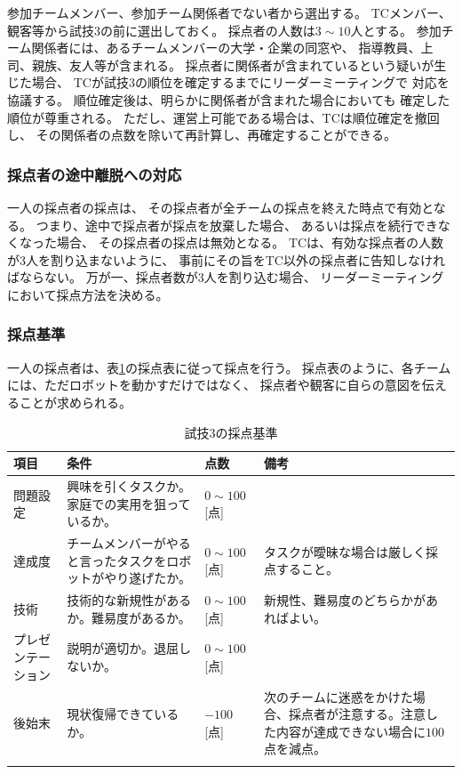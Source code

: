 \documentclass[a4j]{jarticle}
\def\thline{\noalign{\hrule height 1pt}}
\begin{document}
参加チームメンバー、参加チーム関係者でない者から選出する。
TCメンバー、観客等から試技3の前に選出しておく。
採点者の人数は$3\sim10$人とする。
参加チーム関係者には、あるチームメンバーの大学・企業の同窓や、
指導教員、上司、親族、友人等が含まれる。
採点者に関係者が含まれているという疑いが生じた場合、
TCが試技3の順位を確定するまでにリーダーミーティングで
対応を協議する。
順位確定後は、明らかに関係者が含まれた場合においても
確定した順位が尊重される。
ただし、運営上可能である場合は、TCは順位確定を撤回し、
その関係者の点数を除いて再計算し、再確定することができる。

\subsubsection{採点者の途中離脱への対応}

一人の採点者の採点は、
その採点者が全チームの採点を終えた時点で有効となる。
つまり、途中で採点者が採点を放棄した場合、
あるいは採点を続行できなくなった場合、
その採点者の採点は無効となる。
TCは、有効な採点者の人数が$3$人を割り込まないように、
事前にその旨をTC以外の採点者に告知しなければならない。
万が一、採点者数が$3$人を割り込む場合、
リーダーミーティングにおいて採点方法を決める。

\subsubsection{採点基準}

一人の採点者は、表\ref{table:test3score}の採点表に従って採点を行う。
採点表のように、各チームには、ただロボットを動かすだけではなく、
採点者や観客に自らの意図を伝えることが求められる。


\begin{table}
\begin{center}
\caption{試技3の採点基準}
\label{table:test3score}
\begin{tabular}{l|p{4cm}|l|p{4cm}}
\thline
項目 & 条件 & 点数 & 備考\\
\hline
問題設定 & 興味を引くタスクか。家庭での実用を狙っているか。 & $0\sim100$[点] & \\
\hline
達成度 & チームメンバーがやると言ったタスクをロボットがやり遂げたか。 & $0\sim100$[点] & タスクが曖昧な場合は厳しく採点すること。 \\
\hline
技術 & 技術的な新規性があるか。難易度があるか。 & $0\sim100$[点]  & 新規性、難易度のどちらかがあればよい。\\
\hline
プレゼンテーション & 説明が適切か。退屈しないか。 & $0\sim100$[点] & \\
\hline
後始末 & 現状復帰できているか。 & $-100$[点] & 次のチームに迷惑をかけた場合、採点者が注意する。注意した内容が達成できない場合に$100$点を減点。\\
\thline
\end{tabular}
\end{center}
\end{table}
\end{document}
